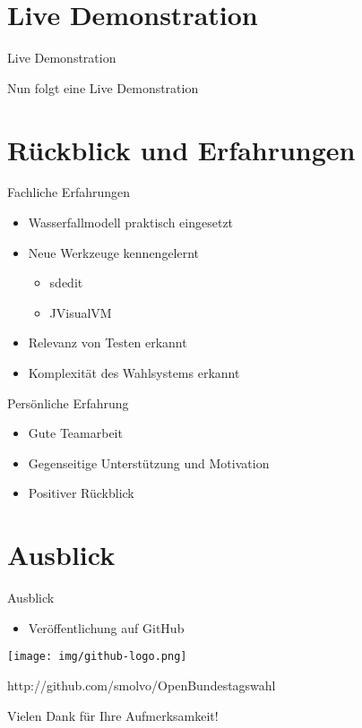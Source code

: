 \documentclass[18pt]{beamer}
\begin{document}
\section{Live Demonstration}
\begin{frame}{Live Demonstration}
\begin{LARGE}
\begin{center}
	Nun folgt eine Live Demonstration
\end{center}
\end{LARGE}
\end{frame}

\section{Rückblick und Erfahrungen}
\begin{frame}{Fachliche Erfahrungen}
\begin{itemize}
	\item Wasserfallmodell praktisch eingesetzt
	\item Neue Werkzeuge kennengelernt
	\begin{itemize}
	\item sdedit
	\item JVisualVM
	\end{itemize}		
	\item Relevanz von Testen erkannt
	\item Komplexität des Wahlsystems erkannt
\end{itemize}
\end{frame}

\begin{frame}{Persönliche Erfahrung}
\begin{itemize}
	\item Gute Teamarbeit
	\item Gegenseitige Unterstützung und Motivation
	\item Positiver Rückblick
\end{itemize}
\end{frame}

\section{Ausblick}
\begin{frame}{Ausblick}
\begin{itemize}
	\item Veröffentlichung auf GitHub
\end{itemize}
\begin{center}
	\texttt{[image: img/github-logo.png]}
\end{center}
\begin{center}
http://github.com/smolvo/OpenBundestagswahl 
\end{center}


\end{frame}

\appendix

\begin{frame}{}

\begin{LARGE}
\begin{center}
	Vielen Dank für Ihre Aufmerksamkeit!
\end{center}
\end{LARGE}
\end{frame}
\end{document}
